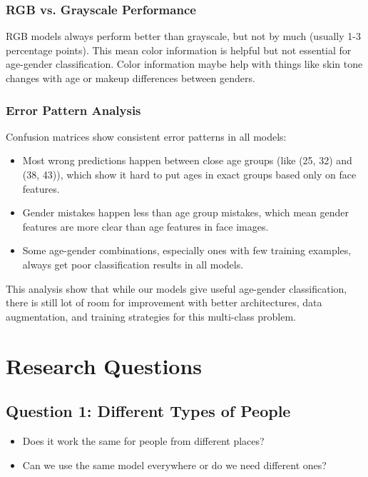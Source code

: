 \documentclass{article}
\begin{document}
\subsubsection{RGB vs. Grayscale Performance}

RGB models always perform better than grayscale, but not by much (usually 1-3 percentage points). This mean color information is helpful but not essential for age-gender classification. Color information maybe help with things like skin tone changes with age or makeup differences between genders.

\subsubsection{Error Pattern Analysis}

Confusion matrices show consistent error patterns in all models:

\begin{itemize}
    \item Most wrong predictions happen between close age groups (like (25, 32) and (38, 43)), which show it hard to put ages in exact groups based only on face features.
    
    \item Gender mistakes happen less than age group mistakes, which mean gender features are more clear than age features in face images.
    
    \item Some age-gender combinations, especially ones with few training examples, always get poor classification results in all models.
\end{itemize}

This analysis show that while our models give useful age-gender classification, there is still lot of room for improvement with better architectures, data augmentation, and training strategies for this multi-class problem.

\newpage
\section{Research Questions}

\subsection*{Question 1: Different Types of People}
\begin{itemize}[leftmargin=1.6cm]
    \item Does it work the same for people from different places?
    \item Can we use the same model everywhere or do we need different ones?
\end{itemize}
\end{document}
